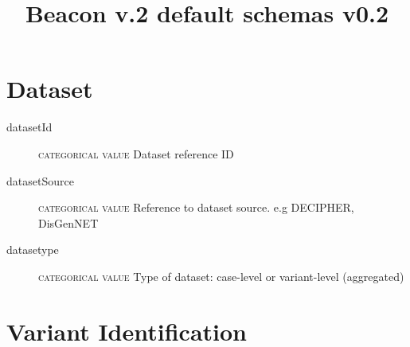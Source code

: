 \documentclass[a4paper, 10pt]{article}        %
\begin{document}
\title{Beacon v.2 default schemas v0.2}
\date{} %
\maketitle





 \section*{{\color{teal}Dataset}}
 \begin{description}
  	\item[datasetId] {\textsc{categorical value}} Dataset reference ID
	\item[datasetSource] {\textsc{categorical value}} Reference to dataset source. e.g DECIPHER, DisGenNET
	\item[datasetype] {\textsc{categorical value}} Type of dataset: case-level or variant-level (aggregated)  
  \end{description}


\section*{{\color{teal}Variant Identification}}

\end{document}
